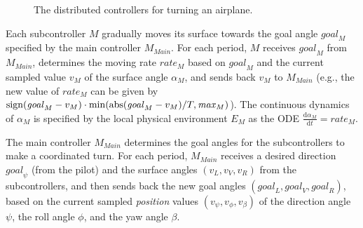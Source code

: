 \begin{figure}
\caption{The distributed controllers for turning an airplane.} \label{fig:airplane-ctrl}
\end{figure}


Each subcontroller $M$ gradually moves its surface towards the goal angle $\mathit{goal}_M$ specified by the main controller $M_\mathit{Main}$.
For each period, $M$ receives $\mathit{goal}_M$ from $M_\mathit{Main}$,
determines the moving rate $\mathit{rate}_M$ based on $\mathit{goal}_M$ 
and the current sampled value $v_M$ of the surface angle $\alpha_M$,
and sends back $v_M$ to $M_\mathit{Main}$
(e.g., the new value of $\mathit{rate}_M$ can be given by
$ \mathrm{sign}(\mathit{goal}_M - v_M) \cdot \min(\mathrm{abs}(\mathit{goal}_M - v_M) / T, \mathit{max}_M)$).
The continuous dynamics of $\alpha_M$ is specified 
by the local physical environment $E_M$
as the ODE $\frac{\mathrm{d}\alpha_M}{\mathrm{d}t} = \mathit{rate}_M$.

The main controller $M_\mathit{Main}$ determines the goal angles for the subcontrollers to make a coordinated turn.
For each period, $M_\mathit{Main}$ receives a  desired direction $\mathit{goal}_\psi$ %
(from the pilot)
and the surface angles $(v_L, v_V, v_R)$ from the subcontrollers, 
and then sends back the new goal angles $(\mathit{goal}_L,\mathit{goal}_V,\mathit{goal}_R)$,
based on the current sampled \emph{position} values $(v_\psi, v_\phi, v_\beta)$ 
of  the direction angle $\psi$, the roll angle $\phi$, and the yaw angle $\beta$.


